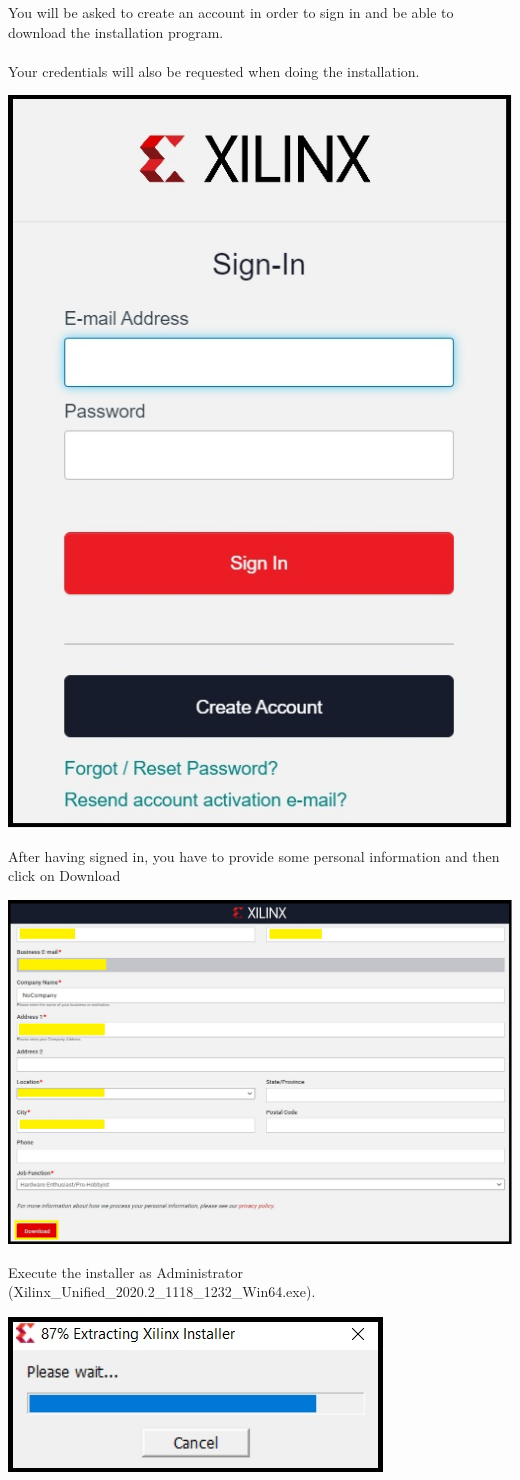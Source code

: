 \begin{minipage}{\linewidth}
  You will be asked to create an account in order to sign in and be able to download the installation program. \\
  \\
  Your credentials will also be requested when doing the installation.
  \\
  \begin{center}
    \includegraphics[width=0.3\linewidth]{images/VivadoInstimg004.jpg}
  \end{center}
\end{minipage}

\begin{minipage}{\linewidth}
  After having signed in, you have to provide some personal information and then click on Download
  \\
  \begin{center}
    \includegraphics[width=0.8\linewidth]{images/VivadoInstimg005.jpg}
  \end{center}
\end{minipage}

\begin{minipage}{\linewidth}
  Execute the installer as Administrator (Xilinx\_Unified\_2020.2\_1118\_1232\_Win64.exe).
  \\
  \begin{center}
    \includegraphics[width=0.5\linewidth]{images/VivadoInstimg006.jpg}
  \end{center}
\end{minipage}

